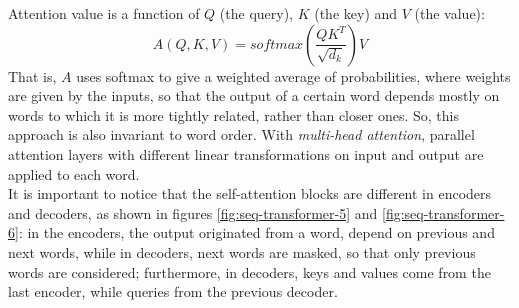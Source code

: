 Attention value is a function of $Q$ (the query), $K$ (the key) and $V$ (the value):
\begin{equation}\label{eq:attention}
A(Q,K,V) = softmax\left(\frac{QK^T}{\sqrt{d_k}}\right) V
\end{equation}
That is, $A$ uses softmax to give a weighted average of probabilities, where weights are given by the inputs, so that the output of a certain word depends mostly on words to which it is more tightly related, rather than closer ones. So, this approach is also invariant to word order. With \textit{multi-head attention}, parallel attention layers with different linear transformations on input and output are applied to each word.\\
It is important to notice that the self-attention blocks are different in encoders and decoders, as shown in figures \ref{fig:seq-transformer-5} and \ref{fig:seq-transformer-6}: in the encoders, the output originated from a word, depend on previous and next words, while in decoders, next words are masked, so that only previous words are considered; furthermore, in decoders, keys and values come from the last encoder, while queries from the previous decoder.

